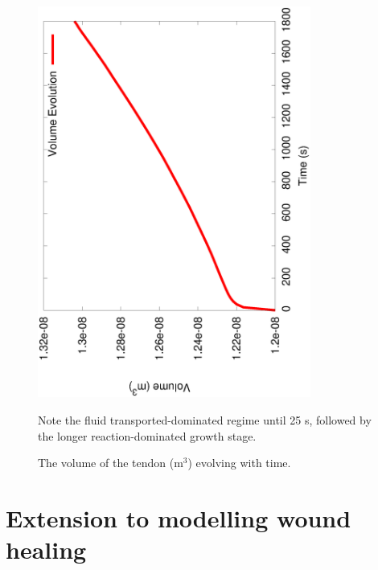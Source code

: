 \begin{figure}[!hpt]
  \begin{center}
    \includegraphics[angle=270,width=0.8\textwidth]{images/examples/lagrangian/swelling/volume-evolution-3}
    \caption{The volume of the tendon (m$^3$) evolving with
      time.}
    \label{volume_evolution}
  \end{center}
  {Note the fluid transported-dominated regime until 25 s,
    followed by the longer reaction-dominated growth stage.}
\end{figure}

\section{Extension to modelling wound healing}
\label{wound-healing-example}



